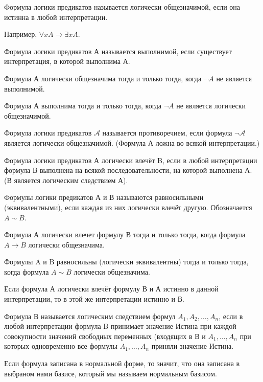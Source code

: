 \begin{definition}
	Формула логики предикатов называется логически общезначимой, если она
	истинна в любой интерпретации. 
\end{definition}

Например, $\forall xA \to \exists xA$.
\begin{definition}
	Формула логики предикатов А называется выполнимой, если существует
	интерпретация, в которой выполнима А.
\end{definition}

\begin{proposition}
Формула А логически общезначима тогда и только тогда, когда $\lnot A$ не является
выполнимой.
\end{proposition}

\begin{proposition}
	Формула А выполнима тогда и только тогда, когда $\lnot A$ не является
	логически общезначимой.
\end{proposition}

\begin{definition}
	Формула логики предикатов $\mathcal{A}$ называется противоречием, если
	формула $\lnot \mathcal{A}$ является логически общезначимой. (Формула А
	ложна во всякой интерпретации.)
\end{definition}

\begin{definition}
	Формула логики предикатов А логически влечёт B, если в любой
	интерпретации формула В выполнена на всякой последовательности, на
	которой выполнена А. (В является логическим следствием А).
\end{definition}

\begin{definition}
	Формулы логики предикатов А и В называются равносильными
	(эквивалентными), если каждая из них логически влечёт другую.
	Обозначается $A \sim B$.
\end{definition}

\begin{theorem}
	Формула А логически влечет формулу В тогда и только тогда, когда формула
	$A\to B$ логически общезначима.
\end{theorem}

\begin{theorem}
	Формулы A и B равносильны (логически эквивалентны) тогда и только тогда,
	когда формула $A \sim B$ логически общезначима.
\end{theorem}
\begin{theorem}
	Если формула А логически влечёт формулу В и А истинно в данной
	интерпретации, то в этой же интерпретации истинно и В.
\end{theorem}
\begin{definition}
	Формула В называется логическим следствием формул $A_1, A_2, \ldots,
	A_n$, если в любой интерпретации формула B принимает значение Истина при
	каждой совокупности значений свободных переменных (входящих в В и $A_1,
	\ldots, A_n$ при которых одновременно все формулы $A_1, \ldots, A_n$
	приняли значение Истина. 
\end{definition}

Если формула записана в нормальной форме, то значит, что она записана в
выбраном нами базисе, который мы называем нормальным базисом.



